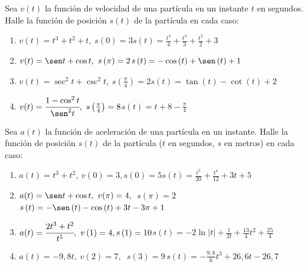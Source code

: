 \begin{ejer}{Sea $v(t)$ la función de velocidad de una partícula en un instante $t$ en segundos. Halle la función de posición $s(t)$ de la partícula en cada caso:}


\begin{enumerate}

\item {$v(t)=t^{3}+t^{2}+t,\ s\left(0\right)=3$}{$s\left( t\right) =\frac{t^{4}}{4}+\frac{t^{3}}{3}+\frac{t^{2}}{2}+3$}

\item {$v(t)=\sen t+\cos t,\ s\left(\pi\right)=2$}{$s\left( t\right) =-\cos \left( t\right) +\sen \left( t\right)
+1$}

\item {$v(t)=\sec ^{2}t+\csc ^{2}t,\
s\left( \frac{\pi }{4}\right) =2$}{$s\left( t\right) =\tan \left( t\right)
-\cot \left( t\right) +2$}

\item {$v(t)=\cfrac{1-\cos ^{2}t}{\sen ^{2}t},\ s\left( \frac{\pi }{4}\right) =8$}{$s\left( t\right) =t+8-\frac{\pi
}{4}$}
\end{enumerate}
\end{ejer}


\clearpage
\begin{ejer}{Sea $a(t)$ la función de aceleración de una partícula en un instante. Halle la función de posición $s(t)$ de la partícula ($t$ en segundos, $s$ en metros) en cada caso:}

\begin{enumerate}

\item {$a(t)=t^{3}+t^{2},\ v\left( 0\right)
=3,s\left( 0\right) =5$}{$s\left( t\right) =\frac{t^{5}}{20}+\frac{t^{4}}{12}+3t+5$}

\item {$a(t)=\sen t+\cos t,\ v(\pi )=4,$ $\
s\left( \pi \right) =2$}{$s\left( t\right) =-\sen \left( t\right) -\cos
\left( t\right) +3t-3\pi +1$}

\item {$a(t)=\cfrac{2t^{3}+t^{2}}{t^{5}},\
v\left( 1\right) =4,s\left( 1\right) =10$}{$s\left( t\right) =-2\ln\left\vert t\right\vert+\frac{1}{2t}+\frac{13}{4}t^{2}+\frac{25}{4}$}

\item {$a(t)=-9,8t,\ v(2)=7,$ $\ s\left(3\right) =9\,$}{$s\left( t\right) =-\frac{9,8}{6}t^{3}+26,6t-26,7$}
\end{enumerate}
\end{ejer}



